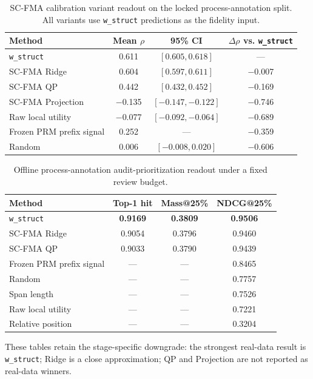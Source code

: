 \documentclass[a4paper,fleqn]{cas-sc}
\begin{document}
\begin{table}[ht]
\caption{SC-FMA calibration variant readout on the locked process-annotation split. All variants use \texttt{w\_struct} predictions as the fidelity input.}
\label{tab:supp-scfma-variants}
\centering
\small
\begin{tabular}{lccc}
\toprule
\textbf{Method} & \textbf{Mean $\rho$} & \textbf{95\% CI} & \textbf{$\Delta\rho$ vs. \texttt{w\_struct}} \\
\midrule
\texttt{w\_struct} & 0.611 & $[0.605,0.618]$ & --- \\
SC-FMA Ridge & 0.604 & $[0.597,0.611]$ & $-$0.007 \\
SC-FMA QP & 0.442 & $[0.432,0.452]$ & $-$0.169 \\
SC-FMA Projection & $-$0.135 & $[-0.147,-0.122]$ & $-$0.746 \\
Raw local utility & $-$0.077 & $[-0.092,-0.064]$ & $-$0.689 \\
Frozen PRM prefix signal & 0.252 & --- & $-$0.359 \\
Random & 0.006 & $[-0.008,0.020]$ & $-$0.606 \\
\bottomrule
\end{tabular}
\end{table}

\begin{table}[ht]
\caption{Offline process-annotation audit-prioritization readout under a fixed review budget.}
\label{tab:supp-audit-prioritization}
\centering
\small
\begin{tabular}{lccc}
\toprule
\textbf{Method} & \textbf{Top-1 hit} & \textbf{Mass@25\%} & \textbf{NDCG@25\%} \\
\midrule
\texttt{w\_struct} & \textbf{0.9169} & \textbf{0.3809} & \textbf{0.9506} \\
SC-FMA Ridge & 0.9054 & 0.3796 & 0.9460 \\
SC-FMA QP & 0.9033 & 0.3790 & 0.9439 \\
Frozen PRM prefix signal & --- & --- & 0.8465 \\
Random & --- & --- & 0.7757 \\
Span length & --- & --- & 0.7526 \\
Raw local utility & --- & --- & 0.7221 \\
Relative position & --- & --- & 0.3204 \\
\bottomrule
\end{tabular}
\end{table}

These tables retain the stage-specific downgrade: the strongest real-data result is \texttt{w\_struct}; Ridge is a close approximation; QP and Projection are not reported as real-data winners.
\end{document}
